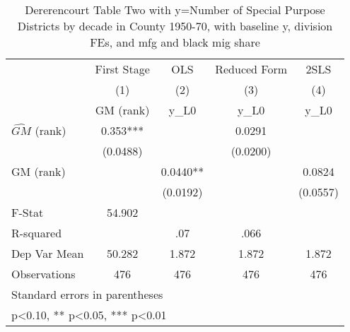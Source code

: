 \begin{table}[htbp]\centering
\def\sym#1{\ifmmode^{#1}\else\(^{#1}\)\fi}
\caption{Dererencourt Table Two with y=Number of Special Purpose Districts by decade in County 1950-70, with baseline y, division FEs, and mfg and black mig share}
\begin{tabular}{l*{4}{c}}
\toprule
                    & First Stage   &         OLS   &Reduced Form   &        2SLS   \\
                    &\multicolumn{1}{c}{(1)}&\multicolumn{1}{c}{(2)}&\multicolumn{1}{c}{(3)}&\multicolumn{1}{c}{(4)}\\
                    &\multicolumn{1}{c}{GM  (rank)}&\multicolumn{1}{c}{y\_L0}&\multicolumn{1}{c}{y\_L0}&\multicolumn{1}{c}{y\_L0}\\
\midrule
$\hat{GM}$ (rank)   &       0.353***&               &      0.0291   &               \\
                    &    (0.0488)   &               &    (0.0200)   &               \\
\addlinespace
GM  (rank)          &               &      0.0440** &               &      0.0824   \\
                    &               &    (0.0192)   &               &    (0.0557)   \\
\midrule
F-Stat              &      54.902   &               &               &               \\
R-squared           &               &         .07   &        .066   &               \\
Dep Var Mean        &      50.282   &       1.872   &       1.872   &       1.872   \\
Observations        &         476   &         476   &         476   &         476   \\
\bottomrule
\multicolumn{5}{l}{\footnotesize Standard errors in parentheses}\\
\multicolumn{5}{l}{\footnotesize * p<0.10, ** p<0.05, *** p<0.01}\\
\end{tabular}
\end{table}
